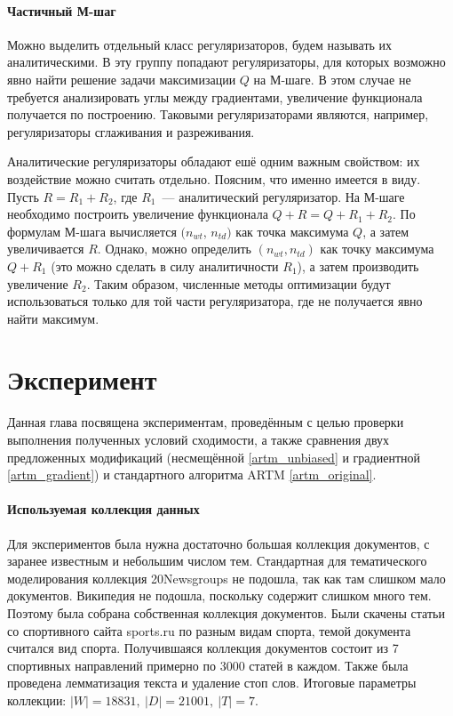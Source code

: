 \documentclass[12pt, twoside]{article}
\begin{document}
\paragraph{Частичный М-шаг}
Можно выделить отдельный класс регуляризаторов, будем называть их аналитическими. В эту группу попадают регуляризаторы, для которых возможно явно найти решение  задачи  максимизации  $Q$ на М-шаге. В этом случае не требуется анализировать углы между градиентами, увеличение функционала получается по построению. Таковыми регуляризаторами являются, например, регуляризаторы сглаживания и разреживания. 

Аналитические регуляризаторы  обладают ешё одним важным свойством: их воздействие можно считать отдельно. Поясним, что именно имеется в виду. Пусть $R = R_1 + R_2$, где $R_1$~--- аналитический регуляризатор. На М-шаге необходимо построить увеличение функционала $Q + R = Q +  R_1 +  R_2$. По формулам М-шага вычисляется $(n_{wt}$, $n_{td})$ как точка максимума $Q$, а затем увеличивается $R$.  Однако, можно определить $(n_{wt},n_{td})$ как точку максимума $Q + R_1 $ (это можно сделать в силу аналитичности $R_1$), а затем производить увеличение $R_2$. Таким образом,  численные методы оптимизации будут использоваться только для той части регуляризатора, где не получается явно найти максимум.

	\section{Эксперимент}
Данная глава посвящена экспериментам, проведённым с целью проверки выполнения полученных условий сходимости, а также сравнения двух предложенных модификаций (несмещённой \eqref{artm_unbiased} и градиентной \eqref{artm_gradient}) и стандартного алгоритма ARTM \eqref{artm_original}. 
\paragraph{Используемая коллекция данных}
Для экспериментов была нужна достаточно большая коллекция документов, с заранее известным  и небольшим числом тем. Стандартная для тематического моделирования  коллекция 20Newsgroups не подошла, так как там слишком мало документов. Википедия не подошла, поскольку содержит слишком много тем. Поэтому была собрана собственная коллекция документов. Были скачены статьи со спортивного сайта sports.ru по разным видам спорта, темой документа считался вид спорта. Получившаяся коллекция документов состоит из 7 спортивных направлений примерно по 3000 статей в каждом. Также была проведена лемматизация текста и удаление стоп слов. Итоговые параметры коллекции: $|W| = 18831,~|D| = 21001,~|T| = 7$.
\end{document}
